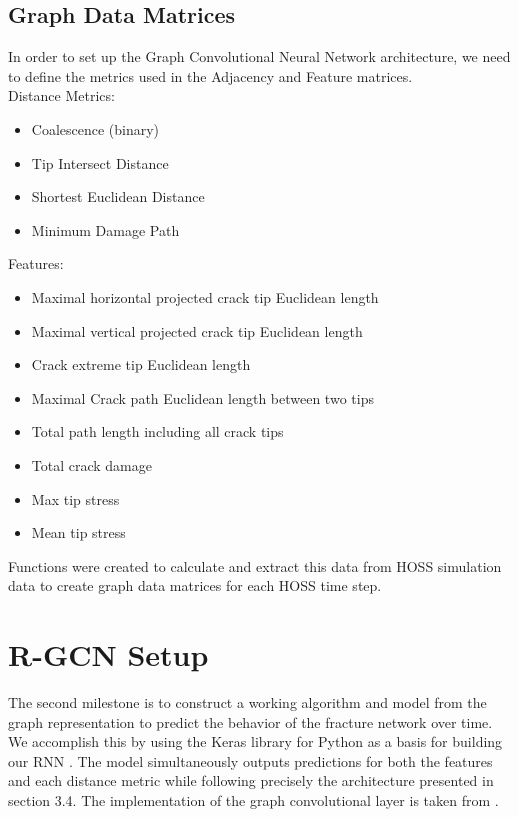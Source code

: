 \subsection{Graph Data Matrices}
In order to set up the Graph Convolutional Neural Network architecture, we need to define the metrics used in the Adjacency and Feature matrices.\\
Distance Metrics:
        \begin{itemize}
        \item Coalescence (binary)
        \item Tip Intersect Distance  
        \item Shortest Euclidean Distance
        \item Minimum Damage Path
        \end{itemize}       
Features:
    \begin{itemize}
	\item Maximal horizontal projected crack tip Euclidean length
	\item Maximal vertical projected crack tip Euclidean length 
	\item Crack extreme tip Euclidean length
    \item Maximal Crack path Euclidean length between two tips
    \item Total path length including all crack tips
    \item Total crack damage
    \item Max tip stress
    \item Mean tip stress
	\end{itemize}
    
Functions were created to calculate and extract this data from HOSS simulation data to create graph data matrices for each HOSS time step.  

\section{R-GCN Setup}
The second milestone is to construct a working algorithm and model from the graph representation to predict the behavior of the fracture network over time. We accomplish this by using the Keras library for Python as a basis for building our RNN \cite{chollet2015keras}. The model simultaneously outputs predictions for both the features and each distance metric while following precisely the architecture presented in section 3.4. The implementation of the graph convolutional layer is taken from \cite{kipf2016semi}.

